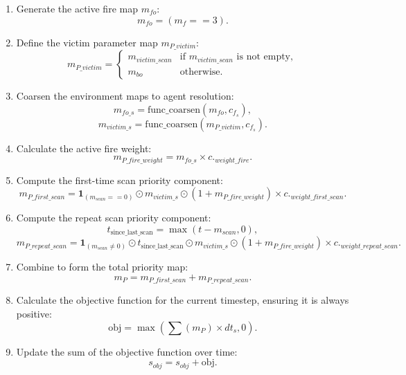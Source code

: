 \documentclass{article}
\begin{document}
\begin{enumerate}
    \item Generate the active fire map $m_{fo}$:
    \[ m_{fo} = (m_f == 3). \]

    \item Define the victim parameter map $m_{P\_victim}$:
    \[ m_{P\_victim} = 
    \begin{cases} 
        m_{victim\_scan} & \text{if } m_{victim\_scan} \text{ is not empty}, \\
        m_{bo} & \text{otherwise}.
    \end{cases} \]

    \item Coarsen the environment maps to agent resolution:
    \[ m_{fo\_s} = \text{func\_coarsen}(m_{fo}, c_{f_s}), \]
    \[ m_{victim\_s} = \text{func\_coarsen}(m_{P\_victim}, c_{f_s}). \]

    \item Calculate the active fire weight:
    \[ m_{P\_fire\_weight} = m_{fo\_s} \times c._{weight\_fire}. \]

    \item Compute the first-time scan priority component:
    \[ m_{P\_first\_scan} = \mathbf{1}_{(m_{scan} == 0)} \odot m_{victim\_s} \odot (1 + m_{P\_fire\_weight}) \times c._{weight\_first\_scan}. \]

    \item Compute the repeat scan priority component:
    \[ t_{\text{since\_last\_scan}} = \max(t - m_{scan}, 0), \]
    \[ m_{P\_repeat\_scan} = \mathbf{1}_{(m_{scan} \neq 0)} \odot t_{\text{since\_last\_scan}} \odot m_{victim\_s} \odot (1 + m_{P\_fire\_weight}) \times c._{weight\_repeat\_scan}. \]

    \item Combine to form the total priority map:
    \[ m_{P} = m_{P\_first\_scan} + m_{P\_repeat\_scan}. \]

    \item Calculate the objective function for the current timestep, ensuring it is always positive:
    \[ \text{obj} = \max(\sum(m_{P}) \times dt_s, 0). \]

    \item Update the sum of the objective function over time:
    \[ s_{obj} = s_{obj} + \text{obj}. \]
\end{enumerate}

\end{document}
